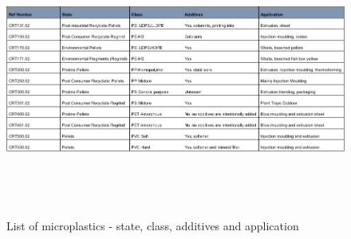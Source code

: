 \begin{appendices}
\begin{figure}
    \centering
    \includegraphics[height = 9cm, angle = 90]{Images/order.png}
    \caption{List of microplastics - state, class, additives and application}
    \label{fig:order}
\end{figure}





\end{appendices}
